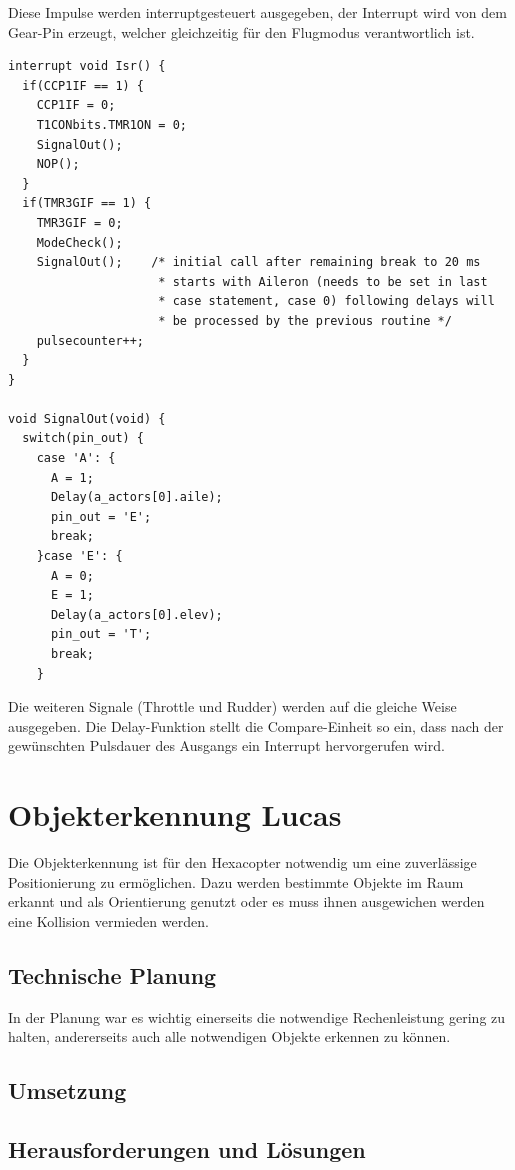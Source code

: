     Diese Impulse werden interruptgesteuert ausgegeben, der Interrupt wird von dem Gear-Pin erzeugt, welcher gleichzeitig für den Flugmodus verantwortlich ist.

    \lstset{language = c}
    \begin{lstlisting}
interrupt void Isr() {
  if(CCP1IF == 1) {
    CCP1IF = 0;
    T1CONbits.TMR1ON = 0;
    SignalOut();
    NOP();
  }
  if(TMR3GIF == 1) {
    TMR3GIF = 0;
    ModeCheck();
    SignalOut();    /* initial call after remaining break to 20 ms
                     * starts with Aileron (needs to be set in last
                     * case statement, case 0) following delays will
                     * be processed by the previous routine */
    pulsecounter++;
  }
}

void SignalOut(void) {
  switch(pin_out) {
    case 'A': {
      A = 1;
      Delay(a_actors[0].aile);
      pin_out = 'E';
      break;
    }case 'E': {
      A = 0;
      E = 1;
      Delay(a_actors[0].elev);
      pin_out = 'T';
      break;
    }
    \end{lstlisting}
    Die weiteren Signale (Throttle und Rudder) werden auf die gleiche Weise ausgegeben.
    Die Delay-Funktion stellt die Compare-Einheit so ein, dass nach der gewünschten Pulsdauer des Ausgangs ein Interrupt hervorgerufen wird.

\section{Objekterkennung Lucas}
Die Objekterkennung ist für den Hexacopter notwendig um eine zuverlässige Positionierung zu ermöglichen. Dazu werden bestimmte Objekte im Raum erkannt und als Orientierung
genutzt oder es muss ihnen ausgewichen werden \bzw eine Kollision vermieden werden.

  \subsection{Technische Planung}
  In der Planung war es wichtig einerseits die notwendige Rechenleistung gering zu halten, andererseits auch alle notwendigen Objekte erkennen zu können.

  \subsection{Umsetzung}

  \subsection{Herausforderungen und Lösungen}

